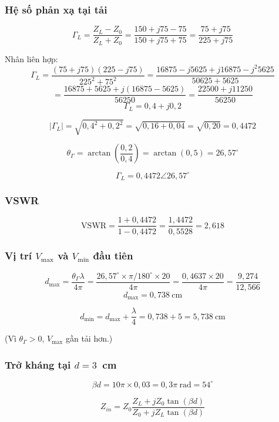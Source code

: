 \documentclass[12pt,a4paper]{article}
\begin{document}
\subsubsection{Hệ số phản xạ tại tải}

\[
\Gamma_L = \frac{Z_L - Z_0}{Z_L + Z_0} = \frac{150 + j75 - 75}{150 + j75 + 75} = \frac{75 + j75}{225 + j75}
\]

Nhân liên hợp:
\[
\Gamma_L = \frac{(75 + j75)(225 - j75)}{225^2 + 75^2} = \frac{16875 - j5625 + j16875 - j^2 5625}{50625 + 5625}
\]
\[
= \frac{16875 + 5625 + j(16875 - 5625)}{56250} = \frac{22500 + j11250}{56250}
\]
\[
\Gamma_L = 0{,}4 + j0{,}2
\]

\[
|\Gamma_L| = \sqrt{0{,}4^2 + 0{,}2^2} = \sqrt{0{,}16 + 0{,}04} = \sqrt{0{,}20} = 0{,}4472
\]

\[
\theta_\Gamma = \arctan\left(\frac{0{,}2}{0{,}4}\right) = \arctan(0{,}5) = 26{,}57^\circ
\]

\[
\Gamma_L = 0{,}4472\angle 26{,}57^\circ
\]

\subsubsection{VSWR}

\[
\boxed{\text{VSWR} = \frac{1 + 0{,}4472}{1 - 0{,}4472} = \frac{1{,}4472}{0{,}5528} = 2{,}618}
\]

\subsubsection{Vị trí $V_{\max}$ và $V_{\min}$ đầu tiên}

\[
d_{\max} = \frac{\theta_\Gamma \lambda}{4\pi} = \frac{26{,}57^\circ \times \pi/180^\circ \times 20}{4\pi} = \frac{0{,}4637 \times 20}{4\pi} = \frac{9{,}274}{12{,}566}
\]
\[
\boxed{d_{\max} = 0{,}738~\text{cm}}
\]

\[
d_{\min} = d_{\max} + \frac{\lambda}{4} = 0{,}738 + 5 = \boxed{5{,}738~\text{cm}}
\]

(Vì $\theta_\Gamma > 0$, $V_{\max}$ gần tải hơn.)

\subsubsection{Trở kháng tại $d = 3$~cm}

\[
\beta d = 10\pi \times 0{,}03 = 0{,}3\pi~\text{rad} = 54^\circ
\]

\[
Z_{in} = Z_0 \frac{Z_L + jZ_0\tan(\beta d)}{Z_0 + jZ_L\tan(\beta d)}
\]
\end{document}
